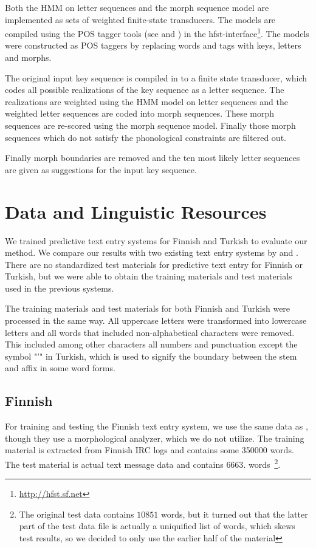 \documentclass{llncs}
\begin{document}
Both the HMM on letter sequences and the morph sequence model are
implemented as sets of weighted finite-state transducers. The models
are compiled using the POS tagger tools (see
\cite{Silfverberg/2010/IceTal} and \cite{Silfverberg/2011}) in the
hfst-interface\footnote{\url{http://hfst.sf.net}}. The models were
constructed as POS taggers by replacing words and tags with keys,
letters and morphs.

The original input key sequence is compiled in to a finite state
transducer, which codes all possible realizations of the key sequence
as a letter sequence. The realizations are weighted using the HMM
model on letter sequences and the weighted letter sequences are coded
into morph sequences. These morph sequences are re-scored using the
morph sequence model. Finally those morph sequences which do not
satisfy the phonological constraints are filtered out. 

Finally morph boundaries are removed and the ten most likely letter
sequences are given as suggestions for the input key sequence.

\section{Data and Linguistic Resources}\label{data}

We trained predictive text entry systems for Finnish and Turkish to
evaluate our method. We compare our results with two existing text
entry systems by \cite{silfverberg/2011/cla} and
\cite{Tantug:2010}. There are no standardized test materials for
predictive text entry for Finnish or Turkish, but we were able to
obtain the training materials and test materials used in the previous
systems.

The training materials and test materials for both Finnish and Turkish
were processed in the same way. All uppercase letters were transformed
into lowercase letters and all words that included non-alphabetical
characters were removed. This included among other characters all
numbers and punctuation except the symbol "'" in Turkish, which is
used to signify the boundary between the stem and affix in some word
forms.

\subsection{Finnish}

For training and testing the Finnish text entry system, we use the
same data as \cite{silfverberg/2011/cla}, though they use a
morphological analyzer, which we do not utilize. The training material
is extracted from Finnish IRC logs and contains some 350000 words. The
test material is actual text message data and contains $6663$.
words~\footnote{The original test data contains $10851$ words, but it
  turned out that the latter part of the test data file is actually a
  uniquified list of words, which skews test results, so we decided
  to only use the earlier half of the material}.
\end{document}
